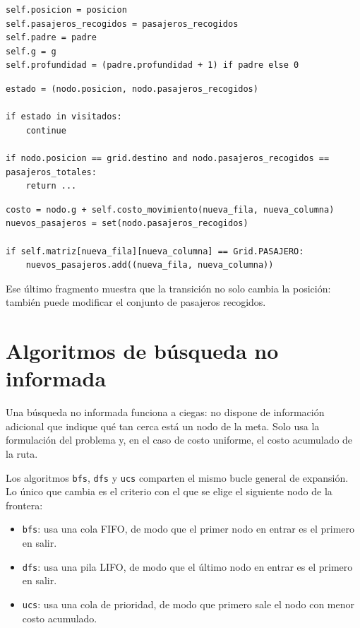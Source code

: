 \documentclass[12pt,a4paper]{article}
\begin{document}
\begin{lstlisting}[style=pythonstyle,caption={Información guardada en Node}]
self.posicion = posicion
self.pasajeros_recogidos = pasajeros_recogidos
self.padre = padre
self.g = g
self.profundidad = (padre.profundidad + 1) if padre else 0
\end{lstlisting}

\begin{lstlisting}[style=pythonstyle,caption={Meta y control de repetición en wrapper.py}]
estado = (nodo.posicion, nodo.pasajeros_recogidos)

if estado in visitados:
    continue

if nodo.posicion == grid.destino and nodo.pasajeros_recogidos == pasajeros_totales:
    return ...
\end{lstlisting}

\begin{lstlisting}[style=pythonstyle,caption={Generación de sucesores y actualización del estado}]
costo = nodo.g + self.costo_movimiento(nueva_fila, nueva_columna)
nuevos_pasajeros = set(nodo.pasajeros_recogidos)

if self.matriz[nueva_fila][nueva_columna] == Grid.PASAJERO:
    nuevos_pasajeros.add((nueva_fila, nueva_columna))
\end{lstlisting}

Ese último fragmento muestra que la transición no solo cambia la posición: también puede modificar el conjunto de pasajeros recogidos.

\section{Algoritmos de búsqueda no informada}
Una búsqueda no informada funciona a ciegas: no dispone de información adicional que indique qué tan cerca está un nodo de la meta. Solo usa la formulación del problema y, en el caso de costo uniforme, el costo acumulado de la ruta.

Los algoritmos \texttt{bfs}, \texttt{dfs} y \texttt{ucs} comparten el mismo bucle general de expansión. Lo único que cambia es el criterio con el que se elige el siguiente nodo de la frontera:\begin{itemize}
    \item \texttt{bfs}: usa una cola FIFO, de modo que el primer nodo en entrar es el primero en salir.
    \item \texttt{dfs}: usa una pila LIFO, de modo que el último nodo en entrar es el primero en salir.
    \item \texttt{ucs}: usa una cola de prioridad, de modo que primero sale el nodo con menor costo acumulado.
\end{itemize}
\end{document}
